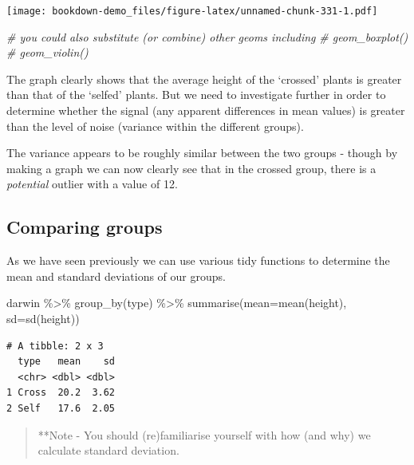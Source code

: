 \documentclass[
]{book}
\newenvironment{Shaded}{\begin{snugshade}}{\end{snugshade}}
\newcommand{\AttributeTok}[1]{\textcolor[rgb]{0.77,0.63,0.00}{#1}}
\newcommand{\CommentTok}[1]{\textcolor[rgb]{0.56,0.35,0.01}{\textit{#1}}}
\newcommand{\FunctionTok}[1]{\textcolor[rgb]{0.00,0.00,0.00}{#1}}
\newcommand{\NormalTok}[1]{#1}
\newcommand{\SpecialCharTok}[1]{\textcolor[rgb]{0.00,0.00,0.00}{#1}}
\begin{document}
\texttt{[image: bookdown-demo\_files/figure-latex/unnamed-chunk-331-1.pdf]}

\begin{Shaded}
\begin{Highlighting}[]
\CommentTok{\# you could also substitute (or combine) other geoms including}
\CommentTok{\# geom\_boxplot()}
\CommentTok{\# geom\_violin()}
\end{Highlighting}
\end{Shaded}

The graph clearly shows that the average height of the `crossed' plants is greater than that of the `selfed' plants. But we need to investigate further in order to determine whether the signal (any apparent differences in mean values) is greater than the level of noise (variance within the different groups).

The variance appears to be roughly similar between the two groups - though by making a graph we can now clearly see that in the crossed group, there is a \emph{potential} outlier with a value of 12.

\hypertarget{comparing-groups}{%
\subsection{Comparing groups}\label{comparing-groups}}

As we have seen previously we can use various tidy functions to determine the mean and standard deviations of our groups.

\begin{Shaded}
\begin{Highlighting}[]
\NormalTok{darwin }\SpecialCharTok{\%\textgreater{}\%} 
  \FunctionTok{group\_by}\NormalTok{(type) }\SpecialCharTok{\%\textgreater{}\%} 
  \FunctionTok{summarise}\NormalTok{(}\AttributeTok{mean=}\FunctionTok{mean}\NormalTok{(height),}
            \AttributeTok{sd=}\FunctionTok{sd}\NormalTok{(height))}
\end{Highlighting}
\end{Shaded}

\begin{verbatim}
# A tibble: 2 x 3
  type   mean    sd
  <chr> <dbl> <dbl>
1 Cross  20.2  3.62
2 Self   17.6  2.05
\end{verbatim}

\begin{quote}
**Note - You should (re)familiarise yourself with how (and why) we calculate standard deviation.
\end{quote}
\end{document}
